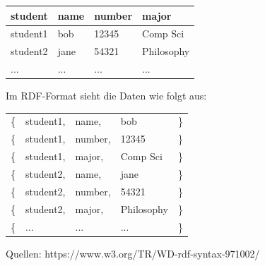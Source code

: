 \documentclass[12pt]{report}
\begin{document}
\begin{enumerate}
  \begin{center}
    \begin{tabular}{l l l l}
      \textbf{student} & \textbf{name} & \textbf{number} & \textbf{major} \\
      \hline
      student1 & bob & 12345 & Comp Sci \\
      student2 & jane & 54321 & Philosophy\\
      ... & ... & ... & ...
    \end{tabular}
  \end{center}

  Im RDF-Format sieht die Daten wie folgt aus:

  \begin{center}
    \begin{tabular}{ l l l l l }
      \{ & student1, & name, & bob & \}\\
      \{ & student1, & number, & 12345 & \}\\
      \{ & student1, & major, & Comp Sci & \}\\
      \{ & student2, & name, & jane & \}\\
      \{ & student2, & number, & 54321 & \}\\
      \{ & student2, & major, & Philosophy & \}\\
      \{ & ... & ... & ... & \}
    \end{tabular}
  \end{center}

  Quellen: https://www.w3.org/TR/WD-rdf-syntax-971002/


\end{enumerate}
\end{document}
